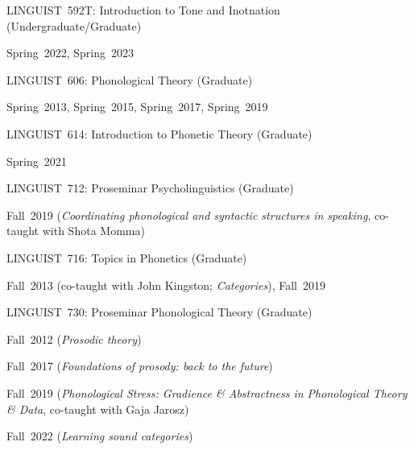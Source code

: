 \documentclass[10pt]{article}
\newcommand{\halfblankline}{\quad\vspace{-0.5\baselineskip}\pagebreak[3]}
\begin{document}
\begin{outerlist}
\begin{innerlist}
        \halfblankline
        \item LINGUIST~592T:
          Introduction to Tone and Inotnation (Undergraduate/Graduate)
        \begin{innerlist}[\enskip$\circ$,leftmargin=*]
            \item Spring~2022, Spring~2023
        \end{innerlist}
        
        \halfblankline
        \item LINGUIST~606:
          Phonological Theory (Graduate)
        \begin{innerlist}[\enskip$\circ$,leftmargin=*]
            \item Spring~2013, Spring~2015, Spring~2017, Spring~2019
        \end{innerlist}
        \halfblankline

        \halfblankline
        \item LINGUIST~614: 
          Introduction to Phonetic Theory (Graduate)
        \begin{innerlist}[\enskip$\circ$,leftmargin=*]
            \item Spring~2021
        \end{innerlist}
        \halfblankline
        
        \item LINGUIST~712:
          Proseminar Psycholinguistics  (Graduate)
        \begin{innerlist}[\enskip$\circ$,leftmargin=*]
            \item Fall~2019 (\emph{Coordinating phonological and syntactic structures in speaking}, co-taught with Shota Momma)
        \end{innerlist}
        
        \halfblankline
        \item LINGUIST~716:
          Topics in Phonetics (Graduate)
        \begin{innerlist}[\enskip$\circ$,leftmargin=*]
            \item Fall~2013 (co-taught with John Kingston; \emph{Categories}), Fall~2019 
        \end{innerlist}

        \halfblankline

        \item LINGUIST~730:
          Proseminar Phonological Theory (Graduate)
        \begin{innerlist}[\enskip$\circ$,leftmargin=*]
            \item Fall~2012 (\emph{Prosodic theory})
            \item Fall~2017 (\emph{Foundations of prosody: back to the future})
            \item Fall~2019 (\emph{Phonological Stress: Gradience \& Abstractness in Phonological Theory \& Data}, co-taught with Gaja Jarosz)
            \item Fall~2022 (\emph{Learning sound categories})
        \end{innerlist}
        \halfblankline
        

\end{innerlist}
\end{outerlist}
\end{document}
